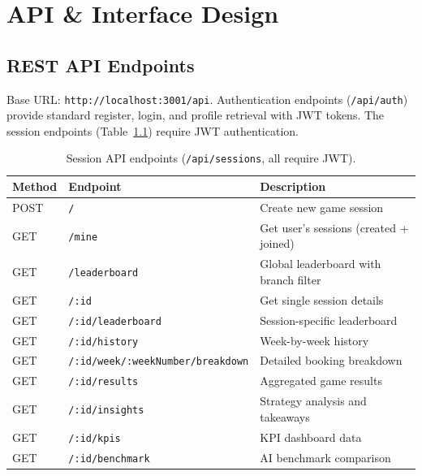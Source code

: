 \documentclass[12pt,a4paper,openany]{report}
\begin{document}
\chapter{API \& Interface Design}
\label{ch:api}

\section{REST API Endpoints}

Base URL: \texttt{http://localhost:3001/api}. Authentication endpoints (\texttt{/api/auth}) provide standard register, login, and profile retrieval with JWT tokens. The session endpoints (Table~\ref{tab:sessionapi}) require JWT authentication.

\begin{table}[H]
\centering
\caption{Session API endpoints (\texttt{/api/sessions}, all require JWT).}
\label{tab:sessionapi}
\small
\begin{tabular}{@{}lll@{}}
\toprule
\textbf{Method} & \textbf{Endpoint} & \textbf{Description} \\
\midrule
POST   & \texttt{/}                              & Create new game session \\
GET    & \texttt{/mine}                           & Get user's sessions (created + joined) \\
GET    & \texttt{/leaderboard}                    & Global leaderboard with branch filter \\
GET    & \texttt{/:id}                            & Get single session details \\
GET    & \texttt{/:id/leaderboard}                & Session-specific leaderboard \\
GET    & \texttt{/:id/history}                    & Week-by-week history \\
GET    & \texttt{/:id/week/:weekNumber/breakdown} & Detailed booking breakdown \\
GET    & \texttt{/:id/results}                    & Aggregated game results \\
GET    & \texttt{/:id/insights}                   & Strategy analysis and takeaways \\
GET    & \texttt{/:id/kpis}                       & KPI dashboard data \\
GET    & \texttt{/:id/benchmark}                  & AI benchmark comparison \\
\bottomrule
\end{tabular}
\end{table}
\end{document}
